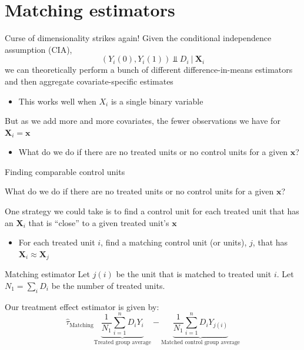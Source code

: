 \documentclass[aspectratio=169,t,11pt,table]{beamer}
\begin{document}
\section{Matching estimators}

\begin{frame}{Curse of dimensionality strikes again!}
  Given the conditional independence assumption (CIA), 
  $$
    (Y_{i}(0), Y_{i}(1)) \Perp D_i \ \vert \ \bm{X}_i
  $$
  we can theoretically perform a bunch of different difference-in-means estimators and then aggregate covariate-specific estimates
  \begin{itemize}
    \item This works well when $X_i$ is a single binary variable
  \end{itemize}

  \pause
  \bigskip
  But as we add more and more covariates, the fewer observations we have for $\bm{X}_i = \bm{x}$
  \begin{itemize}
    \item What do we do if there are no treated units or no control units for a given $\bm{x}$?
  \end{itemize}
\end{frame}

\begin{frame}{Finding comparable control units}
  \begin{center}
    What do we do if there are no treated units or no control units for a given $\bm{x}$?
  \end{center}

  \bigskip
  One strategy we could take is to find a control unit for each treated unit that has an $\bm{X}_i$ that is ``close'' to a given treated unit's $\bm{x}$
  \begin{itemize}
    \item For each treated unit $i$, find a matching control unit (or units), $j$, that has $\bm{X}_i \approx \bm{X}_j$
  \end{itemize}
\end{frame}

\begin{frame}{Matching estimator}
  Let $j(i)$ be the unit that is matched to treated unit $i$. Let $N_1 = \sum_i D_i$ be the number of treated units. 
  
  \bigskip 
  Our treatment effect estimator is given by:
  $$
    \hat{\tau}_{\text{Matching}}
    \underbrace{\frac{1}{N_1} \sum_{i = 1}^n D_i Y_i}_{\text{Treated group average}} -
    \underbrace{\frac{1}{N_1} \sum_{i = 1}^n D_i Y_{j(i)}}_{\text{Matched control group average}}
  $$
\end{frame}
\end{document}
